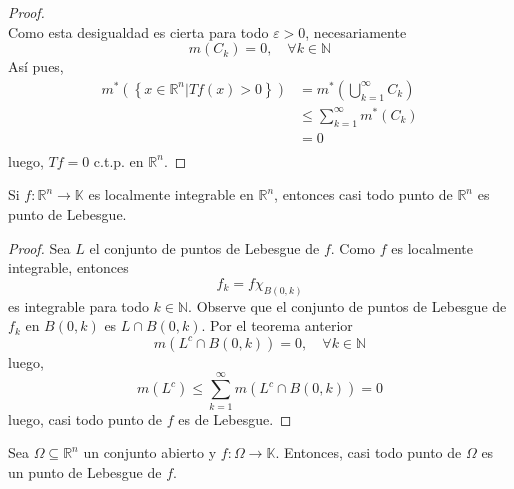 \documentclass[12pt]{report}
\newcounter{it}
\theoremstyle{largebreak}
\renewcommand{\leq}{\ensuremath{\leqslant}}
\newcommand\cf[3]{\ensuremath{#1:#2\rightarrow#3}}
\begin{document}
\begin{proof}
\begin{equation*}
        \end{equation*}
        Como esta desigualdad es cierta para todo $\varepsilon>0$, necesariamente
        \begin{equation*}
            m(C_k)=0,\quad\forall k\in\mathbb{N}
        \end{equation*}
        Así pues,
        \begin{equation*}
            \begin{split}
                m^*\left(\left\{x\in\mathbb{R}^n\Big|Tf(x)>0 \right\} \right)&=m^*\left(\bigcup_{ k=1}^\infty C_k \right)\\
                &\leq \sum_{ k=1}^\infty m^*(C_k)\\
                &=0\\
            \end{split}
        \end{equation*}
        luego, $Tf=0$ c.t.p. en $\mathbb{R}^n$.
    \end{proof}

    \begin{cor}
        Si $\cf{f}{\mathbb{R}^n}{\mathbb{K}}$ es localmente integrable en $\mathbb{R}^n$, entonces casi todo punto de $\mathbb{R}^n$ es punto de Lebesgue.
    \end{cor}

    \begin{proof}
        Sea $L$ el conjunto de puntos de Lebesgue de $f$. Como $f$ es localmente integrable, entonces
        \begin{equation*}
            f_k=f\chi_{B(0,k)}
        \end{equation*}
        es integrable para todo $k\in\mathbb{N}$. Observe que el conjunto de puntos de Lebesgue de $f_k$ en $B(0,k)$ es $L\cap B(0,k)$. Por el teorema anterior
        \begin{equation*}
            m(L^c\cap B(0,k))=0,\quad\forall k\in\mathbb{N}
        \end{equation*}
        luego,
        \begin{equation*}
            m(L^c)\leq\sum_{ k=1}^\infty m(L^c\cap B(0,k))=0
        \end{equation*}
        luego, casi todo punto de $f$ es de Lebesgue.
    \end{proof}

    \begin{cor}
        Sea $\Omega\subseteq\mathbb{R}^n$ un conjunto abierto y $\cf{f}{\Omega}{\mathbb{K}}$. Entonces, casi todo punto de $\Omega$ es un punto de Lebesgue de $f$.
    \end{cor}
\end{document}
